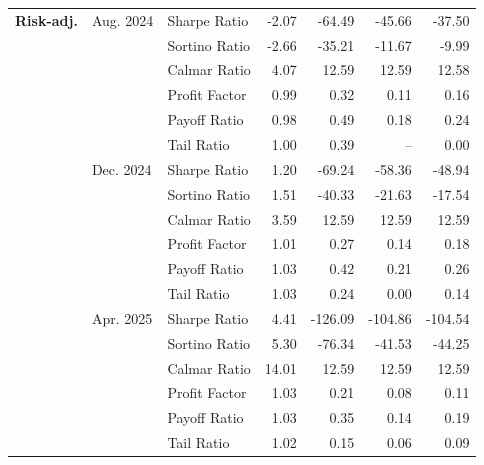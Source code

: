 \begin{table}[H]
{\begin{tabular*}{\textwidth}{@{\extracolsep{\fill}} l l l r r r r}
\textbf{Risk-adj.}
& Aug. 2024 & Sharpe Ratio              & -2.07     & -64.49     & -45.66     & -37.50 \\
&           & Sortino Ratio             & -2.66     & -35.21     & -11.67     & -9.99 \\
&           & Calmar Ratio              & 4.07      & 12.59      & 12.59      & 12.58 \\
&           & Profit Factor             & 0.99      & 0.32       & 0.11       & 0.16 \\
&           & Payoff Ratio              & 0.98      & 0.49       & 0.18       & 0.24 \\
&           & Tail Ratio                & 1.00      & 0.39       & --         & 0.00 \\
& Dec. 2024 & Sharpe Ratio              & 1.20     & -69.24     & -58.36     & -48.94 \\
&           & Sortino Ratio             & 1.51     & -40.33     & -21.63     & -17.54 \\
&           & Calmar Ratio              & 3.59     & 12.59      & 12.59      & 12.59 \\
&           & Profit Factor             & 1.01     & 0.27       & 0.14       & 0.18 \\
&           & Payoff Ratio              & 1.03     & 0.42       & 0.21       & 0.26 \\
&           & Tail Ratio                & 1.03     & 0.24       & 0.00       & 0.14 \\
& Apr. 2025 & Sharpe Ratio              & 4.41     & -126.09     & -104.86     & -104.54 \\
&           & Sortino Ratio             & 5.30     & -76.34      & -41.53      & -44.25 \\
&           & Calmar Ratio              & 14.01    & 12.59       & 12.59       & 12.59 \\
&           & Profit Factor             & 1.03     & 0.21        & 0.08        & 0.11 \\
&           & Payoff Ratio              & 1.03     & 0.35        & 0.14        & 0.19 \\
&           & Tail Ratio                & 1.02     & 0.15        & 0.06        & 0.09 \\
\midrule


\end{tabular*}}
\end{table}
